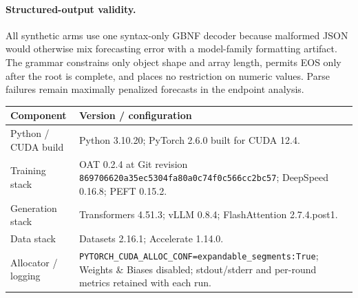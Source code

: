 \begin{center}
\begin{minipage}{\linewidth}
\centering
{}
\label{tab:exp3c-full-stochastic-blocks}
\scriptsize
\setlength{\tabcolsep}{1.7pt}
\renewcommand{\arraystretch}{0.82}
\resizebox{\linewidth}{!}{%

}
\end{minipage}
\end{center}


\paragraph{Structured-output validity.}
All synthetic arms use one syntax-only GBNF decoder because malformed JSON would
otherwise mix forecasting error with a model-family formatting artifact. The
grammar constrains only object shape and array length, permits EOS only after the
root is complete, and places no restriction on numeric values. Parse failures
remain maximally penalized forecasts in the endpoint analysis.


\begin{center}
\begin{minipage}{\linewidth}
\centering
{}
\label{tab:exp3-runtime}
\scriptsize
\setlength{\tabcolsep}{3pt}
\begin{tabular}{p{.29\linewidth}p{.66\linewidth}}
\toprule
\textbf{Component} & \textbf{Version / configuration} \\
\midrule
Python / CUDA build & Python 3.10.20; PyTorch 2.6.0 built for CUDA 12.4. \\
Training stack & OAT 0.2.4 at Git revision
\texttt{869706620a35ec5304fa80a0\allowbreak{}c74f0c566cc2bc57}; DeepSpeed 0.16.8; PEFT 0.15.2. \\
Generation stack & Transformers 4.51.3; vLLM 0.8.4; FlashAttention 2.7.4.post1. \\
Data stack & Datasets 2.16.1; Accelerate 1.14.0. \\
Allocator / logging & \texttt{PYTORCH\_CUDA\_ALLOC\_CONF=expandable\_segments:True};
Weights \& Biases disabled; stdout/stderr and per-round metrics retained with each
run. \\
\bottomrule
\end{tabular}
\end{minipage}
\end{center}

